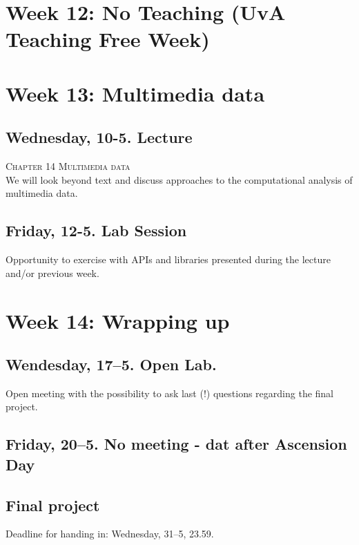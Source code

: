 \section*{Week 12: No Teaching (UvA Teaching Free Week)}







\section*{Week 13: Multimedia data}

\subsection*{Wednesday, 10-5. Lecture}
\textsc{ Chapter 14 Multimedia data}\\
We will look beyond text and discuss approaches to the computational analysis of multimedia data.


\subsection*{Friday, 12-5. Lab Session}
Opportunity to exercise with APIs and libraries presented during the lecture and/or previous week.




\section*{Week 14: Wrapping up}

\subsection*{Wendesday, 17--5. Open Lab.}
Open meeting with the possibility to ask last (!) questions regarding the final project.


\subsection*{Friday, 20--5. No meeting - dat after Ascension Day}



\subsection*{Final project}
Deadline for handing in: Wednesday, 31--5, 23.59.
